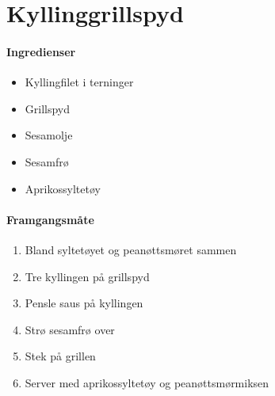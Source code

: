 \section{Kyllinggrillspyd}

\paragraph{Ingredienser}
\begin{itemize}[noitemsep]
	\item Kyllingfilet i terninger
	\item Grillspyd
	\item Sesamolje
	\item Sesamfrø
	\item Aprikossyltetøy
\end{itemize}

\paragraph{Framgangsmåte}
\begin{enumerate}[noitemsep]
	\item Bland syltetøyet og peanøttsmøret sammen
	\item Tre kyllingen på grillspyd
	\item Pensle saus på kyllingen
	\item Strø sesamfrø over
	\item Stek på grillen
	\item Server med aprikossyltetøy og peanøttsmørmiksen
\end{enumerate}

